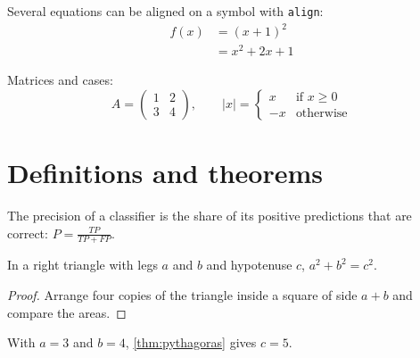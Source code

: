 Several equations can be aligned on a symbol with \texttt{align}:
\begin{align}
  f(x) &= (x + 1)^2 \nonumber \\
       &= x^2 + 2x + 1 \label{eq:expanded}
\end{align}

Matrices and cases:
\[
  A = \begin{pmatrix} 1 & 2 \\ 3 & 4 \end{pmatrix},
  \qquad
  |x| = \begin{cases} x & \text{if } x \geq 0 \\ -x & \text{otherwise} \end{cases}
\]

\section{Definitions and theorems}

\begin{definition}[Precision]
  \label{def:precision}
  The precision of a classifier is the share of its positive predictions
  that are correct: $P = \frac{TP}{TP + FP}$.
\end{definition}

\begin{theorem}
  \label{thm:pythagoras}
  In a right triangle with legs $a$ and $b$ and hypotenuse $c$,
  $a^2 + b^2 = c^2$.
\end{theorem}

\begin{proof}
  Arrange four copies of the triangle inside a square of side $a + b$ and
  compare the areas.
\end{proof}

\begin{example}
  With $a = 3$ and $b = 4$, \cref{thm:pythagoras} gives $c = 5$.
\end{example}
